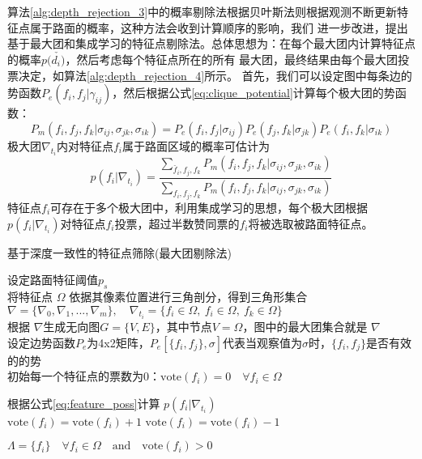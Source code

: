 算法\ref{alg:depth_rejection_3}中的概率剔除法根据贝叶斯法则根据观测不断更新特征点属于路面的概率，这种方法会收到计算顺序的影响，我们
进一步改进，提出基于最大团和集成学习的特征点剔除法。总体思想为：在每个最大团内计算特征点的概率$p(\check{d_i)} $，然后考虑每个特征点所在的所有
最大团，最终结果由每个最大团投票决定，如算法\ref{alg:depth_rejection_4}所示。
首先，我们可以设定图中每条边的势函数$P_e(f_i,f_j|\gamma_{ij})$，然后根据公式\eqref{eq:clique_potential}计算每个极大团的势函数：
\begin{equation}
    P_m(f_i,f_j,f_k|\sigma_{ij},\sigma_{jk},\sigma_{ik}) = P_e(f_i,f_j|\sigma_{ij})P_e(f_j,f_k|\sigma_{jk})P_e(f_i,f_k|\sigma_{ik})
    \label{eq:clique_potential}
\end{equation}
极大团$\nabla_{t_i}$内对特征点$f_i$属于路面区域的概率可估计为
\begin{equation}
    p(f_i|\nabla_{t_i}) =\frac{\sum_{\check{f_i},f_j,f_k}P_m(f_i,f_j,f_k|\sigma_{ij},\sigma_{jk},\sigma_{ik})}{\sum_{f_i,f_j,f_k}P_m(f_i,f_j,f_k|\sigma_{ij},\sigma_{jk},\sigma_{ik})}
    \label{eq:feature_poss}
\end{equation}
特征点$f_i$可存在于多个极大团中，利用集成学习的思想，每个极大团根据$p(f_i|\nabla_{t_i})$对特征点$f_i$投票，超过半数赞同票的$f_i$将被选取被路面特征点。
\begin{algorithm}
    \caption{基于深度一致性的特征点筛除(最大团剔除法)}
    设定路面特征阈值$p_s$\\
    将特征点 $\Omega$ 依据其像素位置进行三角剖分，得到三角形集合$\nabla =\{\nabla_0,\nabla_1,...,\nabla_m\},\quad \nabla_{t_i}=\{f_i\in\Omega,\ f_i\in\Omega,\ f_k\in\Omega\}$\\
    根据 $\nabla$生成无向图$G=\{V,E\}$，其中节点$V=\Omega$，图中的最大团集合就是 $\nabla$ \\
    设定边势函数$P_e$为4x2矩阵，$P_e[\{f_i, f_j \},\sigma]$代表当观察值为$\sigma$时，$\{f_i, f_j\}$是否有效的的势\\
    初始每一个特征点的票数为0：$\text{vote}(f_i)=0\quad \forall f_i \in \Omega$
    {   
        {
            根据公式\eqref{eq:feature_poss}计算 $p(f_i|\nabla_{t_i})$ \\
            {
                $\text{vote}(f_i) = \text{vote}(f_i)+1$
            }
            {
                $\text{vote}(f_i) = \text{vote}(f_i)-1$
            }

        }      
    }
    $\Lambda = \{f_i\} \quad \forall f_i \in  \Omega \quad \text{and} \quad  \text{vote}(f_i)>0$
  \label{alg:depth_rejection_4}
\end{algorithm}
